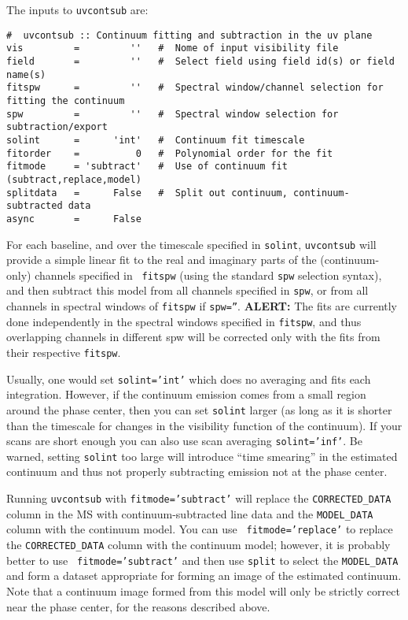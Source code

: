 The inputs to {\tt uvcontsub} are:
\small
\begin{verbatim}
#  uvcontsub :: Continuum fitting and subtraction in the uv plane
vis         =         ''   #  Nome of input visibility file
field       =         ''   #  Select field using field id(s) or field name(s)
fitspw      =         ''   #  Spectral window/channel selection for fitting the continuum
spw         =         ''   #  Spectral window selection for subtraction/export
solint      =      'int'   #  Continuum fit timescale
fitorder    =          0   #  Polynomial order for the fit
fitmode     = 'subtract'   #  Use of continuum fit (subtract,replace,model)
splitdata   =      False   #  Split out continuum, continuum-subtracted data
async       =      False   
\end{verbatim}
\normalsize

For each baseline, and over the timescale specified in {\tt solint},
{\tt uvcontsub} will provide a simple linear fit to the real and
imaginary parts of the (continuum-only) channels specified in {\tt
fitspw} (using the standard {\tt spw} selection syntax), 
and then subtract this model from all channels specified in {\tt spw}, or
from all channels in spectral windows of {\tt fitspw} if {\tt spw=''}.
{\bf ALERT:} The fits are currently done independently in the
spectral windows specified in {\tt fitspw}, and thus overlapping
channels in different spw will be corrected only with the fits from
their respective {\tt fitspw}.

Usually, one would set {\tt solint='int'} which does no
averaging and fits each integration.  However, if the continuum
emission comes from a small region around the phase center, then
you can set {\tt solint} larger (as long as it is 
shorter than the timescale for changes in the
visibility function of the continuum).
If your scans are short enough you can also use scan averaging 
{\tt solint='inf'}.  Be warned, setting {\tt solint} too large will
introduce ``time smearing'' in the estimated continuum and thus not
properly subtracting emission not at the phase center.  

Running {\tt uvcontsub} with {\tt fitmode='subtract'} will replace the
{\tt CORRECTED\_DATA} column in the MS with continuum-subtracted line data
and the {\tt MODEL\_DATA} column with the continuum model.  You can use {\tt
fitmode='replace'} to replace the {\tt CORRECTED\_DATA} column with the
continuum model; however, it is probably better to use {\tt
fitmode='subtract'} and then use {\tt split} to select the {\tt MODEL\_DATA}
and form a dataset appropriate for forming an image of the estimated
continuum.  Note that a continuum image formed from this model will
only be strictly correct near the phase center, for the reasons
described above.

